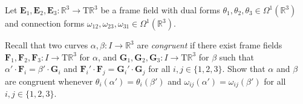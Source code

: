 \documentclass[12 pt, letterpaper]{hmcpset}
\begin{document}
\begin{problem}[Problem 2.]
	Let $\mathbf{E}_{1}, \mathbf{E}_{2}, \mathbf{E}_{3} : \mathbb{R}^{3} \to \mathrm{T} \mathbb{R}^{3}$ be a frame field with dual forms $\theta_{1}, \theta_2, \theta_{3} \in \Omega^{1}(\mathbb{R}^{3})$ and connection forms $\omega_{12}, \omega_{23}, \omega_{31} \in \Omega^{1}(\mathbb{R}^{3})$. 

	Recall that two curves $\alpha, \beta : I \to \mathbb{R}^{3}$ are \textit{congruent} if there exist frame fields $\mathbf{F}_{1}, \mathbf{F}_{2}, \mathbf{F}_{3} : I \to \mathrm{T}\mathbb{R}^{3}$ for $\alpha$, and $\mathbf{G}_{1}, \mathbf{G}_{2}, \mathbf{G}_3 : I \to \mathrm{T} \mathbb{R}^{3}$ for $\beta$ such that $\alpha' \cdot \mathbf{F}_{i} = \beta' \cdot \mathbf{G}_{i}$ and $\mathbf{F}_{i}' \cdot \mathbf{F}_{j} = \mathbf{G}_{i}' \cdot \mathbf{G}_{j}$ for all $i, j \in \{ 1, 2, 3 \}$. Show that $\alpha$ and $\beta$ are congruent whenever $\theta_{i}(\alpha') = \theta_{i}(\beta')$ and $\omega_{ij}(\alpha') = \omega_{ij}(\beta')$ for all $i, j \in \{ 1, 2, 3 \}$.
\end{problem}
\end{document}
